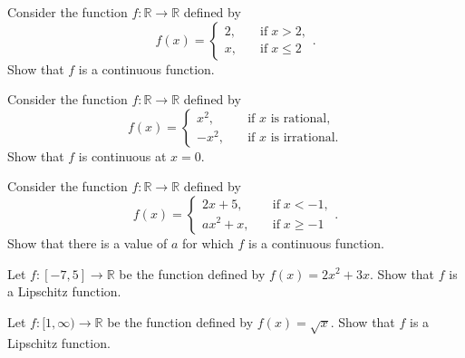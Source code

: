  \begin{question}{\themyquestion}
 Consider the function $f:\mathbb{R}\rightarrow\mathbb{R}$ defined by
 \[f(x)=\begin{cases} 2,\quad &\text{if}\;x>2,\\
 x,\quad & \text{if}\;x\leq 2\end{cases}.\]
 Show that $f$ is a continuous function.
\end{question}
\atc
 \begin{question}{\themyquestion}
  Consider the function $f:\mathbb{R}\rightarrow\mathbb{R}$ defined by
 \[f(x)=\begin{cases} x^2,\quad &\text{if $x$ is rational},\\
 -x^2,\quad & \text{if $x$ is irrational}.\end{cases}\]Show that $f$ is continuous at $x=0$.
 
\end{question}
\atc
 \begin{question}{\themyquestion}
  Consider the function $f:\mathbb{R}\rightarrow\mathbb{R}$ defined by
 \[f(x)=\begin{cases} 2x+5,\quad &\text{if}\;x<-1,\\
 ax^2+x,\quad & \text{if}\;x\geq -1\end{cases}.\]
 Show that there is a value of $a$ for which $f$ is a continuous function.
\end{question}
\atc
 \begin{question}{\themyquestion}
 Let $f:[-7, 5]\rightarrow\mathbb{R}$ be the function defined by $f(x)=2x^2+3x$. Show that $f$ is  a Lipschitz function.
\end{question}
\atc
 
 \begin{question}{\themyquestion}
Let $f:[1, \infty)\rightarrow \mathbb{R}$ be the function defined by $f(x)=\sqrt{x}$. Show that $f$ is a Lipschitz function.
\end{question}
\vp

